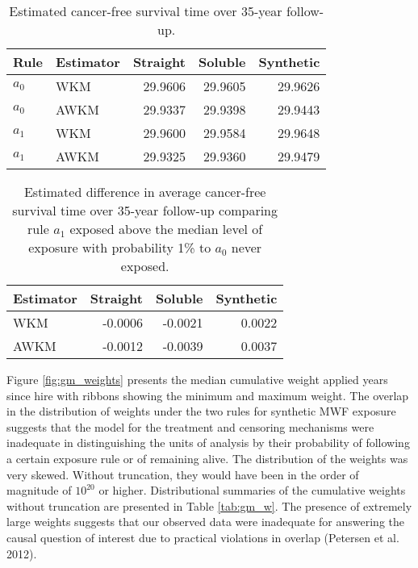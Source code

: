 \documentclass[
  11pt,
]{article}
\begin{document}
\begin{table}[H]
\centering
\caption{Estimated cancer-free survival time over 35-year follow-up.} 
\label{tab:gm_survival}
\begin{tabular}{llrrr}
  \toprule
Rule & Estimator & Straight & Soluble & Synthetic \\ 
  \midrule
$a_0$ & WKM & 29.9606 & 29.9605 & 29.9626 \\ 
  $a_0$ & AWKM & 29.9337 & 29.9398 & 29.9443 \\ 
   \midrule
$a_1$ & WKM & 29.9600 & 29.9584 & 29.9648 \\ 
  $a_1$ & AWKM & 29.9325 & 29.9360 & 29.9479 \\ 
   \bottomrule
\end{tabular}
\end{table}
\begin{table}[H]
\centering
\caption{Estimated difference in average cancer-free survival time over 35-year follow-up comparing rule $a_1$ exposed above the median level of exposure with probability 1\% to $a_0$ never exposed.} 
\label{tab:gm_differences}
\begin{tabular}{lrrr}
  \toprule
Estimator & Straight & Soluble & Synthetic \\ 
  \midrule
WKM & -0.0006 & -0.0021 & 0.0022 \\ 
  AWKM & -0.0012 & -0.0039 & 0.0037 \\ 
   \bottomrule
\end{tabular}
\end{table}

Figure \ref{fig:gm_weights} presents the median cumulative weight
applied years since hire with ribbons showing the minimum and maximum
weight. The overlap in the distribution of weights under the two rules
for synthetic MWF exposure suggests that the model for the treatment and
censoring mechanisms were inadequate in distinguishing the units of
analysis by their probability of following a certain exposure rule or of
remaining alive. The distribution of the weights was very skewed.
Without truncation, they would have been in the order of magnitude of
\(10^{20}\) or higher. Distributional summaries of the cumulative
weights without truncation are presented in Table \ref{tab:gm_w}. The
presence of extremely large weights suggests that our observed data were
inadequate for answering the causal question of interest due to
practical violations in overlap (Petersen et al. 2012).
\end{document}
